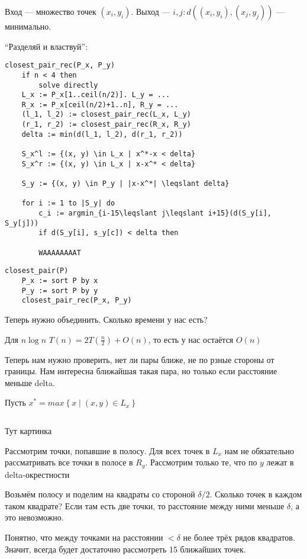 


\maketitle

Вход --- множество точек $(x_i, y_i)$. Выход --- $i, j: d((x_i, y_i), (x_j, y_j))$ --- минимально.

``Разделяй и властвуй'':

\begin{lstlisting}
closest_pair_rec(P_x, P_y)
    if n < 4 then
        solve directly
    L_x := P_x[1..ceil(n/2)]. L_y = ...
    R_x := P_x[ceil(n/2)+1..n], R_y = ...
    (l_1, l_2) := closest_pair_rec(L_x, L_y)
    (r_1, r_2) := closest_pair_rec(R_x, R_y)
    delta := min(d(l_1, l_2), d(r_1, r_2))
    
    S_x^l := {(x, y) \in L_x | x^*-x < delta}
    S_x^r := {(x, y) \in L_x | x-x^* < delta}

    S_y := {(x, y) \in P_y | |x-x^*| \leqslant delta}

    for i := 1 to |S_y| do
        c_i := argmin_{i-15\leqslant j\leqslant i+15}(d(S_y[i], S_y[j]))
        if d(S_y[i], s_y[c]) < delta then

        WAAAAAAAAT
\end{lstlisting}

\begin{lstlisting}
closest_pair(P)
    P_x := sort P by x
    P_y := sort P by y
    closest_pair_rec(P_x, P_y)
\end{lstlisting}

Теперь нужно объединить. Сколько времени у нас есть?

Для $n\log n$ $T(n) = 2T(\frac{n}{2}) + O(n)$, то есть у нас остаётся $O(n)$

Теперь нам нужно проверить, нет ли пары ближе, не по рзные стороны от границы. Нам интересна ближайшая такая пара, но только если расстояние меньше delta.

Пусть $x^* = max\left\{ x\mid(x, y)\in L_x \right\}$

\begin{lstlisting}
\end{lstlisting}

Тут картинка

Рассмотрим точки, попавшие в полосу. Для всех точек в $L_x$ нам не обязательно рассматривать все точки в полосе в $R_y$. Рассмотрим только те, что по $y$ лежат в delta-окрестности


Возьмём полосу и поделим на квадраты со стороной $\delta/2$. Сколько точек в каждом таком квадрате? Если там есть две точки, то расстояние между ними меньше $\delta$, а это невозможно.

Понятно, что между точками на расстоянии $<\delta$ не более трёх рядов квадратов. Значит, всегда будет достаточно рассмотреть 15 ближайших точек.


